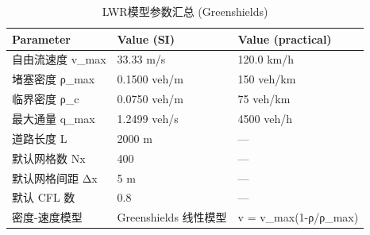 \begin{table}
\caption{LWR模型参数汇总 (Greenshields)}
\label{tab:params}
\begin{tabular}{lll}
\toprule
Parameter & Value (SI) & Value (practical) \\
\midrule
自由流速度 v_max & 33.33 m/s & 120.0 km/h \\
堵塞密度 ρ_max & 0.1500 veh/m & 150 veh/km \\
临界密度 ρ_c & 0.0750 veh/m & 75 veh/km \\
最大通量 q_max & 1.2499 veh/s & 4500 veh/h \\
道路长度 L & 2000 m & — \\
默认网格数 Nx & 400 & — \\
默认网格间距 Δx & 5 m & — \\
默认 CFL 数 & 0.8 & — \\
密度-速度模型 & Greenshields 线性模型 & v = v_max(1-ρ/ρ_max) \\
\bottomrule
\end{tabular}
\end{table}
